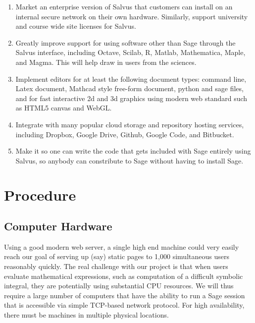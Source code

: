 \documentclass[11pt]{article}
\begin{document}
\begin{enumerate}
\item Market an enterprise version of Salvus that customers can
  install on an internal secure network on their own hardware.
  Similarly, support university and course wide site licenses for
  Salvus.
\item Greatly improve support for using software other than Sage
  through the Salvus interface, including Octave, Scilab, R, Matlab,
  Mathematica, Maple, and Magma. This will help draw in users from the
  sciences.
\item Implement editors for at least the following document types:
  command line, Latex document, Mathcad style free-form document,
  python and sage files, and for fast interactive 2d and 3d graphics
  using modern web standard such as HTML5 canvas and WebGL.
\item Integrate with many popular cloud storage and repository hosting
  services, including Dropbox, Google Drive, Github, Google Code, and
  Bitbucket.
\item Make it so one can write the code that
  gets included with Sage entirely using Salvus, so anybody can
  constribute to Sage without having to install Sage.
\end{enumerate}


\section{Procedure}


\subsection{Computer Hardware}
Using a good modern web server, a single high end machine could very
easily reach our goal of serving up (say) static pages to 1,000
simultaneous users reasonably quickly.  The real challenge with our
project is that when users evaluate mathematical expressions, such as
computation of a difficult symbolic integral, they are potentially
using substantial CPU resources.  We will thus require a large number
of computers that have the ability to run a Sage session that is
accessible via simple TCP-based network protocol.  For high
availability, there must be machines in multiple physical locations.
\end{document}
